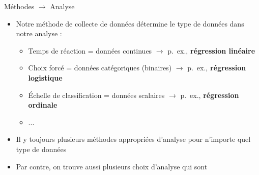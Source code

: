 \documentclass[xcolor=dvipsnames, onlymath, 10pt, aspectratio=169, handout]{beamer}
\begin{document}
\begin{frame}{Méthodes $\rightarrow$ Analyse}{}

	\begin{itemize}
		\item Notre méthode de collecte de données détermine le type de données dans notre analyse :

		      \pause

		      \begin{itemize}
			      \item Temps de réaction = données continues $\rightarrow$ p.\ ex., \textbf{régression linéaire}
			            \pause

			      \item Choix forcé = données catégoriques (binaires) $\rightarrow$ p.\ ex., \textbf{régression logistique}
			            \pause

			      \item Échelle de classification = données scalaires $\rightarrow$ p.\ ex., \textbf{régression ordinale}
			      \item ...
		      \end{itemize}
		\item Il y toujours plusieurs méthodes appropriées d'analyse pour n'importe quel type de données
		\item[\winner] Par contre, on trouve aussi plusieurs choix d'analyse qui sont 

	\end{itemize}


\end{frame}
\end{document}
